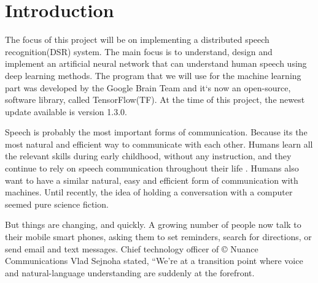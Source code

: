 \chapter{Introduction}\label{ch:introduction}

The focus of this project will be on implementing a distributed speech recognition(DSR) system.
 The main focus is to understand, design and implement an artificial neural network that can understand human speech using deep learning methods. 
 The program that we will use for the machine learning part was developed by the Google Brain Team and it`s now an open-source, software library, called TensorFlow(TF). 
 At the time of this project, the newest update available is version 1.3.0. \cite{tensorflow2015-whitepaper}

Speech is probably the most important forms of communication. Because its the most natural and efficient way to communicate with each other. Humans learn all the relevant skills during early childhood, without any instruction, and they continue to rely on speech communication throughout their life \cite{kamblespeech}. Humans also want to have a similar natural, easy and efficient form of communication with machines. Until recently, the idea of holding a conversation with a computer seemed pure science fiction.

But things are changing, and quickly. A growing number of people now talk to their mobile smart phones, asking them to set reminders, search for directions, or send email and text messages. Chief technology officer of \copyright{} Nuance Communications Vlad Sejnoha stated, “We’re at a transition point where voice and natural-language understanding are suddenly at the forefront.




\cite{kamblespeech}
 






